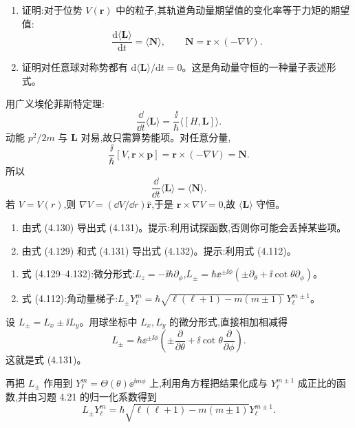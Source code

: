 \begin{question}
\begin{enumerate}
\item 证明:对于位势 $V(\mathbf r)$ 中的粒子,其轨道角动量期望值的变化率等于力矩的期望值:
\[
\frac{\mathrm d\langle\mathbf L\rangle}{\mathrm dt}=\langle\mathbf N\rangle,
\qquad \mathbf N=\mathbf r\times(-\nabla V).
\]
\item 证明对任意球对称势都有 $\mathrm d\langle\mathbf L\rangle/\mathrm dt=0$。这是角动量守恒的一种量子表述形式。
\end{enumerate}
\begin{solution}

用广义埃伦菲斯特定理:
\[
\frac{\dd}{\dd t}\langle\mathbf L\rangle=\frac{\ii}{\hbar}\langle[H,\mathbf L]\rangle.
\]
动能 $p^2/2m$ 与 $\mathbf L$ 对易,故只需算势能项。对任意分量,
\[
\frac{\ii}{\hbar}[V,\mathbf r\times\mathbf p]
=\mathbf r\times(-\nabla V)=\mathbf N.
\]
所以
\[
\frac{\dd}{\dd t}\langle\mathbf L\rangle=\langle\mathbf N\rangle.
\]
若 $V=V(r)$,则 $\nabla V=(\dd V/\dd r)\hat{\mathbf r}$,于是 $\mathbf r\times\nabla V=0$,故 $\langle\mathbf L\rangle$ 守恒。

\end{solution}
\end{question}

\begin{question}
\begin{enumerate}
\item 由式 (4.130) 导出式 (4.131)。提示:利用试探函数,否则你可能会丢掉某些项。
\item 由式 (4.129) 和式 (4.131) 导出式 (4.132)。提示:利用式 (4.112)。
\end{enumerate}

\par\smallskip
{}
\begin{enumerate}[leftmargin=2.2em,itemsep=0.12em,topsep=0.12em,parsep=0pt]
\item 式 (4.129--4.132):微分形式:$L_z=-\ii\hbar\partial_\phi$,$L_\pm=\hbar \ee^{\pm\ii\phi}(\pm\partial_\theta+\ii\cot\theta\partial_\phi)$。
\item 式 (4.112):角动量梯子:$L_\pm Y_\ell^m=\hbar\sqrt{\ell(\ell+1)-m(m\pm1)}\,Y_\ell^{m\pm1}$。
\end{enumerate}

\begin{solution}

设 $L_\pm=L_x\pm\ii L_y$。用球坐标中 $L_x,L_y$ 的微分形式,直接相加相减得
\[
L_\pm=\hbar \ee^{\pm\ii\phi}\left(\pm\frac{\partial}{\partial\theta}+\ii\cot\theta\frac{\partial}{\partial\phi}\right).
\]
这就是式 (4.131)。

再把 $L_\pm$ 作用到 $Y_\ell^m=\Theta(\theta)\ee^{\ii m\phi}$ 上,利用角方程把结果化成与 $Y_\ell^{m\pm1}$ 成正比的函数,并由习题 4.21 的归一化系数得到
\[
L_\pm Y_\ell^m=\hbar\sqrt{\ell(\ell+1)-m(m\pm1)}Y_\ell^{m\pm1}.
\]

\end{solution}
\end{question}

